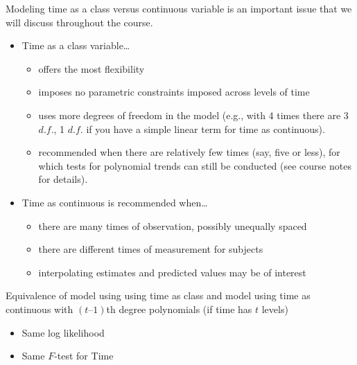 \documentclass[
  9pt,
  ignorenonframetext,
]{beamer}
\providecommand{\tightlist}{%
  \setlength{\itemsep}{0pt}\setlength{\parskip}{0pt}}
\begin{document}
\begin{frame}{}
\protect\hypertarget{section-7}{}
\begin{block}{Modeling time as a class versus continuous variable is an
important issue that we will discuss throughout the course.}
\protect\hypertarget{modeling-time-as-a-class-versus-continuous-variable-is-an-important-issue-that-we-will-discuss-throughout-the-course.}{}
\begin{itemize}
\tightlist
\item
  Time as a class variable\ldots{}

  \begin{itemize}
  \tightlist
  \item
    offers the most flexibility
  \item
    imposes no parametric constraints imposed across levels of time
  \item
    uses more degrees of freedom in the model (e.g., with 4 times there
    are 3 \(d.f.\), 1 \(d.f.\) if you have a simple linear term for time
    as continuous).
  \item
    recommended when there are relatively few times (say, five or less),
    for which tests for polynomial trends can still be conducted (see
    course notes for details).
  \end{itemize}
\item
  Time as continuous is recommended when\ldots{}

  \begin{itemize}
  \tightlist
  \item
    there are many times of observation, possibly unequally spaced
  \item
    there are different times of measurement for subjects
  \item
    interpolating estimates and predicted values may be of interest
  \end{itemize}
\end{itemize}
\end{block}

\begin{block}{Equivalence of model using using time as class and model
using time as continuous with \((t–1)\)th degree polynomials (if time
has \(t\) levels)}
\protect\hypertarget{equivalence-of-model-using-using-time-as-class-and-model-using-time-as-continuous-with-t1th-degree-polynomials-if-time-has-t-levels}{}
\begin{itemize}
\tightlist
\item
  Same log likelihood
\item
  Same \(F\)-test for Time
\end{itemize}
\end{block}
\end{frame}
\end{document}
